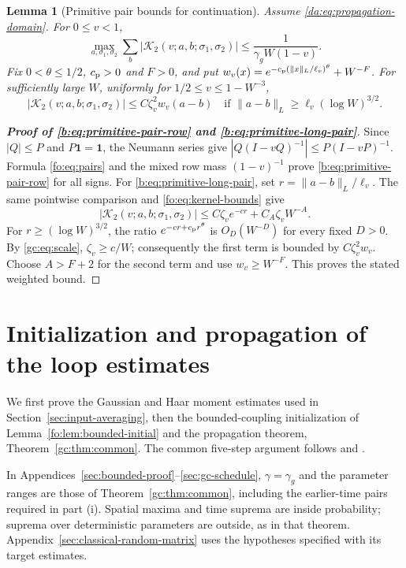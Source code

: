 \documentclass[11pt]{article}
\numberwithin{equation}{section}
\newtheorem{lemma}[theorem]{Lemma}
\theoremstyle{remark}
\newcommand{\cK}{\mathcal K}
\begin{document}
\begin{lemma}[Primitive pair bounds for continuation]
\label{b:lem:primitive-pair}
Assume \eqref{da:eq:propagation-domain}. For $0\le v<1$,
\begin{equation}\label{b:eq:primitive-pair-row}
 \max_{a,\sigma_1,\sigma_2}\sum_b
 |\cK_2(v;a,b;\sigma_1,\sigma_2)|
 \le\frac1{\gamma_gW(1-v)}.
\end{equation}
Fix $0<\theta\le1/2$, $c_{\rm p}>0$ and $F>0$, and put
$w_v(x)=e^{-c_{\rm p}(\|x\|_L/\ell_v)^\theta}+W^{-F}$.
For sufficiently large $W$, uniformly for $1/2\le v\le1-W^{-3}$,
\begin{equation}\label{b:eq:primitive-long-pair}
 |\cK_2(v;a,b;\sigma_1,\sigma_2)|
 \le C\zeta_v^2w_v(a-b)
 \quad\text{if }\|a-b\|_L\ge\ell_v(\log W)^{3/2}.
\end{equation}
\end{lemma}
\begin{proof}[\textbf{Proof of \eqref{b:eq:primitive-pair-row} and
\eqref{b:eq:primitive-long-pair}}]
Since $|Q|\le P$ and $P\mathbf1=\mathbf1$, the Neumann series give
$|Q(I-vQ)^{-1}|\le P(I-vP)^{-1}$. Formula
\eqref{fo:eq:pairs} and the mixed row mass $(1-v)^{-1}$ prove
\eqref{b:eq:primitive-pair-row} for all signs.
For \eqref{b:eq:primitive-long-pair}, set $r=\|a-b\|_L/\ell_v$.
The same pointwise comparison and \eqref{fo:eq:kernel-bounds} give
\[
 |\cK_2(v;a,b;\sigma_1,\sigma_2)|
 \le C\zeta_v e^{-cr}+C_A\zeta_vW^{-A}.
\]
For $r\ge(\log W)^{3/2}$, the ratio $e^{-cr+c_{\rm p}r^\theta}$ is
$O_D(W^{-D})$ for every fixed $D>0$.
By \eqref{gc:eq:scale}, $\zeta_v\ge c/W$; consequently the first
term is bounded by $C\zeta_v^2w_v$. Choose $A>F+2$ for the second
term and use $w_v\ge W^{-F}$. This proves the stated weighted bound.
\end{proof}

\section{Initialization and propagation of the loop estimates}
\label{app:gaussian-continuation}
\label{sec:fo-propagation-proof}\label{sec:gc-scheme}

We first prove the Gaussian and Haar moment estimates used in
Section~\ref{sec:input-averaging}, then the bounded-coupling initialization
of Lemma~\ref{fo:lem:bounded-initial} and the propagation theorem,
Theorem~\ref{gc:thm:common}.
The common five-step argument follows
\cite[Sections~5.1--5.7]{YY} and \cite[Sections~7.1--7.6]{TYY}.

In Appendices~\ref{sec:bounded-proof}--\ref{sec:gc-schedule},
$\gamma=\gamma_g$ and the parameter ranges are those of
Theorem~\ref{gc:thm:common}, including the earlier-time pairs required
in part \textup{(i)}. Spatial maxima and time suprema are inside
probability; suprema over deterministic parameters are outside,
as in that theorem. Appendix~\ref{sec:classical-random-matrix}
uses the hypotheses specified with its target estimates.
\end{document}
